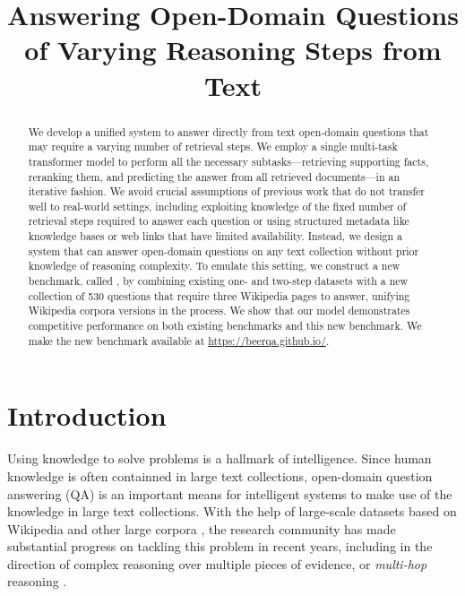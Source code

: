 \title{Answering Open-Domain Questions of Varying Reasoning Steps from Text}



\maketitle

\newif\ifaclfinal
\aclfinaltrue
\ifaclfinal
\renewcommand*{\thefootnote}{\fnsymbol{footnote}}
\setcounter{footnote}{1}
\renewcommand*{\thefootnote}{\arabic{footnote}}
\setcounter{footnote}{0}
\fi

\begin{abstract}

    We develop a unified system to answer directly from text open-domain questions that may require a varying number of retrieval steps.
    We employ a single multi-task transformer model to perform all the necessary subtasks---retrieving supporting facts, reranking them, and predicting the answer from all retrieved documents---in an iterative fashion.
    We avoid crucial assumptions of previous work that do not transfer well to real-world settings, including exploiting knowledge of the fixed number of retrieval steps required to answer each question or using structured metadata like knowledge bases or web links that have limited availability.
    Instead, we design a system that can answer open-domain questions  on any text collection without prior knowledge of reasoning complexity.
    To emulate this setting, we construct a new benchmark, called \beerqa{}, by combining existing one- and two-step datasets with a new collection of 530 questions that require three Wikipedia pages to answer, unifying Wikipedia corpora versions in the process.
    We show that our model demonstrates competitive performance on both existing benchmarks and this new benchmark.
    We make the new benchmark available at \url{https://beerqa.github.io/}.

     
 
\end{abstract}
\section{Introduction}

Using knowledge to solve problems is a hallmark of intelligence.
Since human knowledge is often containned in large text collections, open-domain question answering (QA) is an important means for intelligent systems to make use of the knowledge in large text collections.
With the help of large-scale datasets based on Wikipedia \citep{rajpurkar2016squad, rajpurkar2018know} and other large corpora \citep{trischler2016newsqa, dunn2017searchqa, talmor2018web}, the research community has made substantial progress on tackling this problem in recent years, including in the direction of complex reasoning over multiple pieces of evidence, or \emph{multi-hop} reasoning \citep{yang2018hotpotqa, welbl2018constructing, chen-etal-2020-hybridqa}. 

